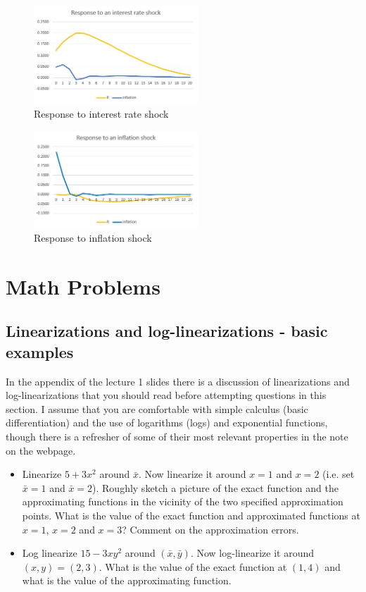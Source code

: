 \documentclass[authoryear,11pt]{elsarticle}
\begin{document}
\begin{figure}[!h]
\caption[Response to interest rate shock]{Response to interest rate shock}
\centering
\label{fig:macro_series}
\includegraphics[width=0.55\textwidth]{response_to_irate.JPG}
\end{figure}

\begin{figure}[!h]
\caption[Response to inflation shock]{Response to inflation shock}
\centering
\label{fig:macro_series}
\includegraphics[width=0.55\textwidth]{response_to_inflation.JPG}
\end{figure}

\section{Math Problems}

\subsection{Linearizations and log-linearizations - basic examples}
In the appendix of the lecture 1 slides there is a discussion of linearizations and log-linearizations that you should read before attempting questions in this section. I assume that you are comfortable with simple calculus (basic differentiation) and the use of logarithms (logs) and exponential functions, though there is a refresher of some of their most relevant properties in the note on the webpage.

\begin{itemize}
\item	Linearize $5 + 3x^{2}$ around $\bar{x}$. Now linearize it around $x=1$ and $x=2$ (i.e. set $\bar{x}=1$ and $\bar{x}=2$). Roughly sketch a picture of the exact function and the approximating functions in the vicinity of the two specified approximation points. What is the value of the exact function and approximated functions at $x=1$, $x=2$ and $x=3$? Comment on the approximation errors.
\item	Log linearize $15 - 3xy^2$ around $(\bar{x},\bar{y})$. Now log-linearize it around $(x,y)=(2,3)$. What is the value of the exact function at $(1,4)$ and what is the value of the approximating function.
\end{itemize}
\end{document}
